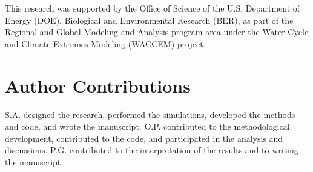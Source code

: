 \documentclass[11pt]{article}
\begin{document}
This research was supported by the Office of Science of the U.S. Department of Energy (DOE), Biological and Environmental Research (BER), as part of the Regional and Global Modeling and Analysis program area under the Water Cycle and Climate Extremes Modeling (WACCEM) project.

\section{Author Contributions}

S.A. designed the research, performed the simulations, developed the methods and code, and wrote the manuscript. O.P. contributed to the methodological development, contributed to the code, and participated in the analysis and discussions. P.G. contributed to the interpretation of the results and to writing the manuscript.


\printbibliography
\end{document}
